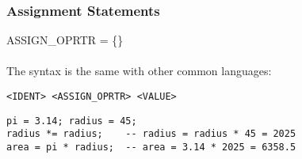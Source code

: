 \subsubsection{Assignment Statements}
ASSIGN\_OPRTR = \{\cd{=, +, -=, *=, /=, \%=}\}\\\\
\noindent The syntax is the same with other common languages:
\begin{verbatim}
<IDENT> <ASSIGN_OPRTR> <VALUE>
\end{verbatim}
\begin{verbatim}
pi = 3.14; radius = 45;
radius *= radius;    -- radius = radius * 45 = 2025
area = pi * radius;  -- area = 3.14 * 2025 = 6358.5
\end{verbatim}